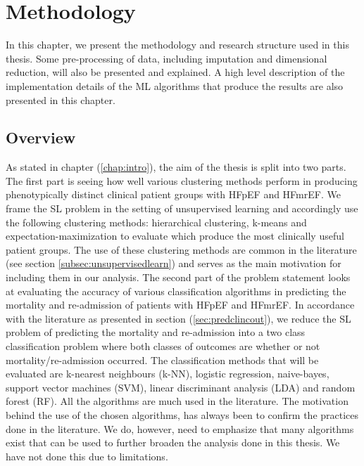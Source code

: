 \documentclass[../thesis.tex]{subfiles}
\begin{document}
\chapter{Methodology}
\label{chap:method}

\noindent In this chapter, we present the methodology and research structure used in this thesis. Some pre-processing of data, including imputation and dimensional reduction, will also be presented and explained. A high level description of the implementation details of the ML algorithms that produce the results are also presented in this chapter.

\section{Overview}
\label{sec:overview}

\noindent As stated in chapter (\ref{chap:intro}), the aim of the thesis is split into two parts. The first part is seeing how well various clustering methods perform in producing phenotypically distinct clinical patient groups with HFpEF and HFmrEF. We frame the SL problem in the setting of unsupervised learning and accordingly use the following clustering methods: hierarchical clustering, k-means and expectation-maximization to evaluate which produce the most clinically useful patient groups. The use of these clustering methods are common in the literature (see section \ref{subsec:unsupervisedlearn}) and serves as the main motivation for including them in our analysis. The second part of the problem statement looks at evaluating the accuracy of various classification algorithms in predicting the mortality and re-admission of patients with HFpEF and HFmrEF. In accordance with the literature as presented in section (\ref{sec:predclincout}), we reduce the SL problem of predicting the mortality and re-admission into a two class classification problem where both classes of outcomes are whether or not mortality/re-admission occurred. The classification methods that will be evaluated are k-nearest neighbours (k-NN), logistic regression, naive-bayes, support vector machines (SVM), linear discriminant analysis (LDA) and random forest (RF). All the algorithms are much used in the literature. The motivation behind the use of the chosen algorithms, has always been to confirm the practices done in the literature. We do, however, need to emphasize that many algorithms exist that can be used to further broaden the analysis done in this thesis. We have not done this due to limitations.
\end{document}
